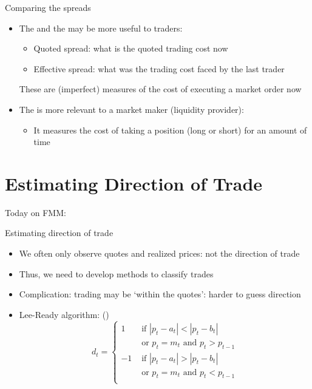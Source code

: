 \documentclass[english,10pt]{beamer}
\begin{document}
\begin{frame}{Comparing the spreads}
	\begin{itemize}
		\item The  and the  may be more useful to traders:
		\begin{itemize}
			\item Quoted spread: what is the quoted trading cost now 
			\item Effective spread: what was the trading cost faced by the last trader
		\end{itemize}
		These are (imperfect) measures of the cost of executing a market order now
		\item The  is more relevant to a market maker (liquidity provider):
		\begin{itemize}
			\item It measures the cost of taking a position (long or short) for an amount of time
		\end{itemize}
	\end{itemize}
\end{frame}



\section{Estimating Direction of Trade}

\begin{frame}{Today on FMM:}
\tableofcontents[currentsection]
\end{frame}


\begin{frame}{Estimating direction of trade}
	\begin{itemize}
		\item We often only observe quotes and realized prices: not the direction of trade
		\item Thus, we need to develop methods to classify trades
		\item Complication: trading may be `within the quotes': harder to guess direction
		\item \alert{Lee-Ready algorithm}: (\citet{lee_inferring_1991})
		\[
		d_t = \left\{
		\begin{aligned}
		1 & \text{ if } |p_t-a_t| < |p_t-b_t| \\
		&\text{ or } p_t=m_t \text{ and } p_t>p_{t-1}\\
		-1 & \text{ if } |p_t-a_t| > |p_t-b_t| \\
		& \text{ or } p_t=m_t \text{ and } p_t<p_{t-1} \\
		\end{aligned}
		\right.
		\]
	\end{itemize}
\end{frame}
\end{document}
